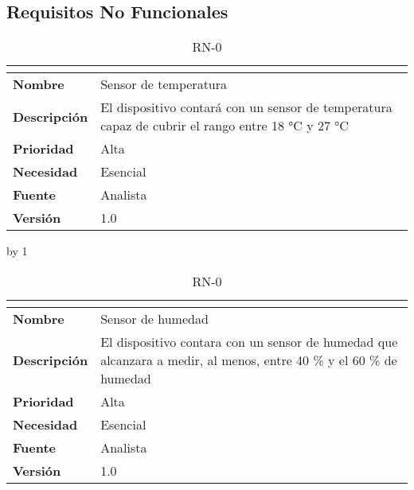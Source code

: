 \subsection{Requisitos No Funcionales}\label{subsec:requisitos-no-funcionales}
\newcount\rn
{}
\begin{table}[H]
	\caption{RN-0\number\rn}
	\begin{tabular}{|l|p{}|}
		\hline
		\multicolumn{2}{|c|}{\cellcolor[HTML]{BFBFBF}{\color[HTML]{000000} \textbf{RN-0\number\rn}}} \\ \hline
		\textbf{Nombre}      & Sensor de temperatura                                                                            \\ \hline
		\textbf{Descripción} & El dispositivo contará con un sensor de temperatura capaz de cubrir el rango entre 18 °C y 27 °C \\ \hline
		\textbf{Prioridad}   & Alta                                                                                             \\ \hline
		\textbf{Necesidad}   & Esencial                                                                                         \\ \hline
		\textbf{Fuente}      & Analista                                                                                         \\ \hline
		\textbf{Versión}     & 1.0                                                                                              \\ \hline
	\end{tabular}
\end{table}
\advance\rn by 1
\begin{table}[H]
	\caption{RN-0\number\rn}
	\begin{tabular}{|l|p{}|}
		\hline
		\multicolumn{2}{|c|}{\cellcolor[HTML]{BFBFBF}{\color[HTML]{000000} \textbf{RN-0\number\rn}}} \\ \hline
		\textbf{Nombre}      & Sensor de humedad                                                                                                  \\ \hline
		\textbf{Descripción} & El dispositivo contara con un sensor de humedad que alcanzara a medir, al menos, entre 40 \% y el 60 \% de humedad \\ \hline
		\textbf{Prioridad}   & Alta                                                                                                               \\ \hline
		\textbf{Necesidad}   & Esencial                                                                                                           \\ \hline
		\textbf{Fuente}      & Analista                                                                                                           \\ \hline
		\textbf{Versión}     & 1.0                                                                                                                \\ \hline
	\end{tabular}
\end{table}
